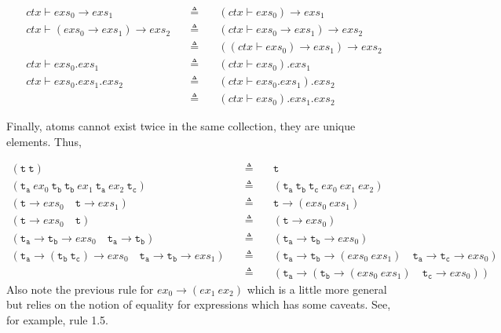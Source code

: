 \documentclass[a4paper,11pt]{article}
\begin{document}
\begin{eqnarray*}
ctx \vdash exs_0 \rightarrow exs_1 \quad&\triangleq&\quad (ctx \vdash exs_0) \rightarrow exs_1 \\
ctx \vdash (exs_0 \rightarrow exs_1) \rightarrow exs_2 \quad&\triangleq&\quad (ctx \vdash exs_0 \rightarrow exs_1) \rightarrow exs_2 \\
                                                            &\triangleq&\quad ((ctx \vdash exs_0) \rightarrow exs_1) \rightarrow exs_2 \\
ctx \vdash exs_0.exs_1 \quad&\triangleq&\quad (ctx \vdash exs_0).exs_1 \\
ctx \vdash exs_0.exs_1.exs_2 \quad&\triangleq&\quad (ctx \vdash exs_0.exs_1).exs_2 \\
                                  &\triangleq&\quad (ctx \vdash exs_0).exs_1.exs_2
\end{eqnarray*}

Finally, atoms cannot exist twice in the same collection, they are unique elements. Thus,

\begin{eqnarray*}
(\mathtt{t}\ \mathtt{t}) \quad&\triangleq&\quad \mathtt{t} \\
(\mathtt{t_a}\ ex_0\ \mathtt{t_b}\ \mathtt{t_b}\ ex_1\ \mathtt{t_a}\ ex_2\ \mathtt{t_c}) \quad&\triangleq&\quad (\mathtt{t_a}\ \mathtt{t_b}\ \mathtt{t_c}\ ex_0\ ex_1\ ex_2) \\
(\mathtt{t} \rightarrow exs_0 \quad \mathtt{t} \rightarrow exs_1) \quad&\triangleq&\quad \mathtt{t} \rightarrow (exs_0\ exs_1) \\
(\mathtt{t} \rightarrow exs_0 \quad \mathtt{t}) \quad&\triangleq&\quad (\mathtt{t} \rightarrow exs_0) \\
(\mathtt{t_a} \rightarrow \mathtt{t_b} \rightarrow exs_0 \quad \mathtt{t_a} \rightarrow \mathtt{t_b}) \quad&\triangleq&\quad (\mathtt{t_a} \rightarrow \mathtt{t_b} \rightarrow exs_0) \\
(\mathtt{t_a} \rightarrow (\mathtt{t_b}\ \mathtt{t_c}) \rightarrow exs_0 \quad \mathtt{t_a} \rightarrow \mathtt{t_b} \rightarrow exs_1) \quad&\triangleq&\quad (\mathtt{t_a} \rightarrow \mathtt{t_b} \rightarrow (exs_0\ exs_1) \quad \mathtt{t_a} \rightarrow \mathtt{t_c} \rightarrow exs_0)\\
    \quad&\triangleq&\quad (\mathtt{t_a} \rightarrow (\mathtt{t_b} \rightarrow (exs_0\ exs_1) \quad \mathtt{t_c} \rightarrow exs_0))
\end{eqnarray*}
Also note the previous rule for $ex_0 \rightarrow (ex_1\ ex_2)$ which is a little more general but relies on the notion of equality for expressions which has some caveats. See, for example, rule 1.5.
\end{document}
